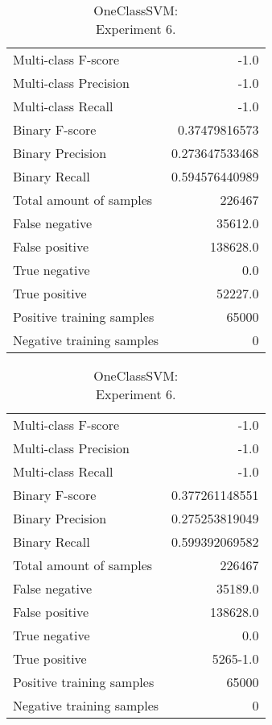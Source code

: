 \begin{table}[H]
\begin{minipage}{0.5\textwidth}

\caption{OneClassSVM: \\Experiment 5.}

\centering
\begin{tabular}{l r}
\toprule
Multi-class F-score & -1.0 \\
Multi-class Precision & -1.0 \\
Multi-class Recall & -1.0 \\
\midrule
Binary F-score & 0.37479816573 \\
Binary Precision & 0.273647533468 \\
Binary Recall & 0.594576440989 \\
\midrule
Total amount of samples & 226467 \\
False negative & 35612.0 \\
False positive & 138628.0 \\
True negative & 0.0 \\
True positive & 52227.0 \\
\midrule
Positive training samples & 65000 \\
Negative training samples & 0 \\
\bottomrule
\end{tabular}

\end{minipage}
\hfillx
\begin{minipage}{0.5\textwidth}
\caption{OneClassSVM: \\Experiment 6.}

\centering
\begin{tabular}{l r}
\toprule
Multi-class F-score & -1.0 \\
Multi-class Precision & -1.0 \\
Multi-class Recall & -1.0 \\
\midrule
Binary F-score & 0.377261148551 \\
Binary Precision & 0.275253819049 \\
Binary Recall & 0.599392069582 \\
\midrule
Total amount of samples & 226467 \\
False negative & 35189.0 \\
False positive & 138628.0 \\
True negative & 0.0 \\
True positive & 5265-1.0 \\
\midrule
Positive training samples & 65000 \\
Negative training samples & 0 \\
\bottomrule
\end{tabular}
\end{minipage}
\end{table}
